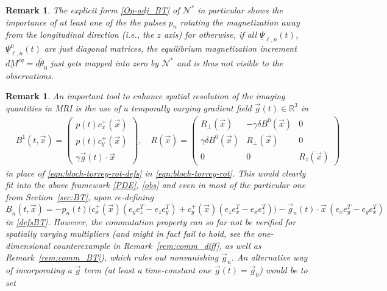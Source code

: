 \documentclass[12pt]{article}
\newtheorem{remark}[theorem]{Remark}
\newcommand\uld[1]{\underline{d#1}}
\newcommand\Op{\mathcal{N}}
\newcommand\vecr{\vec{x}}
\newcommand\ulB{\underline{B}}
\newcommand\ulPsi{\underline{\Psi}}
\begin{document}
\begin{remark}\label{rem:rot}
The explicit form \eqref{Op-adj_BT} of $\Op^*$ in particular shows the importance of at least one of the the pulses $p_n$ rotating the magnetization away from the longitudinal direction (i.e., the $z$ axis) for otherwise, if all $\ulPsi_{\ell,n}(t)$, $\ulPsi_{\ell,n}^0(t)$ are just diagonal matrices, the equilibrium magnetization increment $\uld{M}^{eq}=\uld{\tilde{\theta}}_0$ just gets mapped into zero by $\Op^*$ and is thus not visible to the observations.
\end{remark}

\begin{remark}
An important tool to enhance spatial resolution of the imaging quantities in MRI is the use of a temporally varying gradient field $\vec{g}(t)\in\mathbb{R}^3$ in
\begin{equation}\label{eqn:bloch-torrey-rot-defs-g}
\begin{aligned}
&B^1(t, \vecr)=
\begin{pmatrix} p(t)c^+_{x}(\vecr)\\p(t)c^+_{y}(\vecr)\\ \gamma\vec{g}(t)\cdot\vecr
\end{pmatrix},
\quad 
R(\vecr)=
\begin{pmatrix}
R_\perp(\vecr)&-\gamma\delta B^0(\vecr)&0\\
\gamma\delta B^0(\vecr)&R_\perp(\vecr)&0\\
0&0&R_z(\vecr)
\end{pmatrix}
\end{aligned}
\end{equation}
in place of \eqref{eqn:bloch-torrey-rot-defs} in \eqref{eqn:bloch-torrey-rot}.
This would clearly fit into the above framework \eqref{PDE}, \eqref{obs} and even in most of the particular one from Section~\ref{sec:BT}, upon re-defining 
\[
\ulB_n(t,\vecr)= 
-p_n(t) \bigl(c_x^+(\vecr)(e_ye_z^T-e_ze_y^T)+c_y^+(\vecr)(e_ze_x^T-e_xe_z^T)\bigr) 
-\vec{g}_n(t)\cdot\vecr \, (e_xe_y^T-e_ye_x^T) 
\]
in \eqref{defsBT}.
However, the commutation property can so far not be verified for spatially varying multipliers (and might in fact fail to hold, see the one-dimensional counterexample in Remark~\ref{rem:comm_diff}, as well as Remark~\ref{rem:comm_BT}), which rules out nonvanishing $\vec{g}_n$. 
An alternative way of incorporating a $\vec{g}$ term (at least a time-constant one $\vec{g}(t)=\vec{g}_0$) would be to set 
\begin{equation*}%

\end{equation*}
\end{remark}
\end{document}
